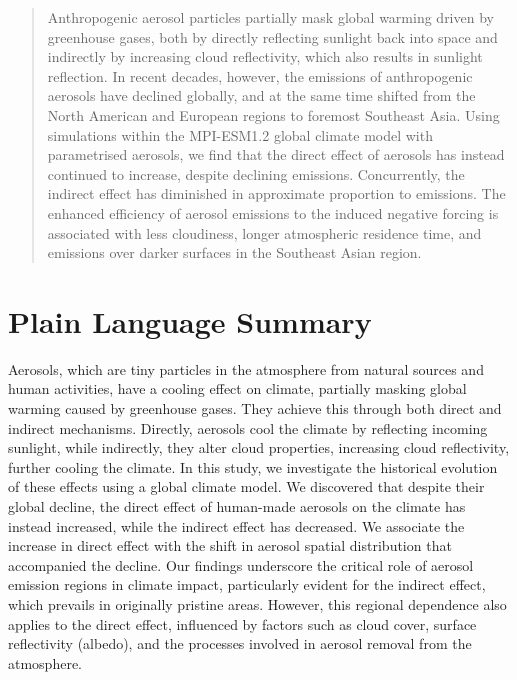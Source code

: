 \documentclass[draft]{agujournal2019}
\begin{document}
\begin{abstract}
Anthropogenic aerosol particles partially mask global warming driven by greenhouse gases, both by directly reflecting sunlight back into space and indirectly by increasing cloud reflectivity, which also results in sunlight reflection. In recent decades, however, the emissions of anthropogenic aerosols have declined globally, and at the same time shifted from the North American and European regions to foremost Southeast Asia. Using simulations within the MPI-ESM1.2 global climate model with parametrised aerosols, we find that the direct effect of aerosols has instead continued to increase, despite declining emissions. Concurrently, the indirect effect has diminished in approximate proportion to emissions. The enhanced efficiency of aerosol emissions to the induced negative forcing is associated with less cloudiness, longer atmospheric residence time, and emissions over darker surfaces in the Southeast Asian region.
\end{abstract}

\section*{Plain Language Summary}
Aerosols, which are tiny particles in the atmosphere from natural sources and human activities, have a cooling effect on climate, partially masking global warming caused by greenhouse gases. They achieve this through both direct and indirect mechanisms. Directly, aerosols cool the climate by reflecting incoming sunlight, while indirectly, they alter cloud properties, increasing cloud reflectivity, further cooling the climate. In this study, we investigate the historical evolution of these effects using a global climate model. We discovered that despite their global decline, the direct effect of human-made aerosols on the climate has instead increased, while the indirect effect has decreased. We associate the increase in direct effect with the shift in aerosol spatial distribution that accompanied the decline. Our findings underscore the critical role of aerosol emission regions in climate impact, particularly evident for the indirect effect, which prevails in originally pristine areas. However, this regional dependence also applies to the direct effect, influenced by factors such as cloud cover, surface reflectivity (albedo), and the processes involved in aerosol removal from the atmosphere.

\end{document}
